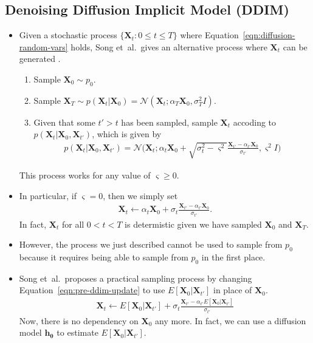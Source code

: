 \documentclass[10pt]{article}
\newcommand{\ve}[1]{\mathbf{#1}}
\newcommand{\ves}[1]{\boldsymbol{#1}}
\newcommand{\etal}{{et~al.}}
\newcommand{\mcal}[1]{\mathcal{#1}}
\begin{document}
\subsection{Denoising Diffusion Implicit Model (DDIM)}

\begin{itemize}  
  \item Given a stochastic process $\{ \ve{X}_t: 0 \leq t \leq T \}$ where Equation~\eqref{eqn:diffusion-random-vars} holds, Song \etal\ gives an alternative process where $\ve{X}_t$ can be generated \cite{Song:DDIM:2022}.
  \begin{enumerate}
    \item Sample $\ve{X}_0 \sim p_0$.
    \item Sample $\ve{X}_T \sim p(\ve{X}_t|\ve{X}_0) =  \mcal{N}(\ve{X}_t; \alpha_T \ve{X}_0, \sigma_T^2 I)$.
    \item Given that some $t' > t$ has been sampled, sample $\ve{X}_t$ accoding to $p(\ve{X}_t|\ve{X}_0, \ve{X}_{t'})$, which is given by
    \begin{align*}
      p(\ve{X}_t|\ve{X}_0, \ve{X}_{t'}) = \mcal{N}\bigg( \ve{X}_t; \alpha_t \ve{X}_0 + \sqrt{\sigma_t^2 - \varsigma^2} \frac{\ve{X}_{t'} - \alpha_{t'} \ve{X}_0}{\sigma_{t'}} , \varsigma^2 I \bigg)
    \end{align*}    
  \end{enumerate}
  This process works for any value of $\varsigma \geq 0$. 
  
  \item In particular, if $\varsigma = 0$, then we simply set
  \begin{align}
    \ve{X}_{t} \gets \alpha_t \ve{X}_0 + \sigma_t \frac{\ve{X}_{t'} - \alpha_{t'} \ve{X}_0}{\sigma_{t'}}. \label{eqn:pre-ddim-update}
  \end{align}
  In fact, $\ve{X}_t$ for all $0 < t < T$ is determistic given we have sampled $\ve{X}_0$ and $\ve{X}_T$.

  \item However, the process we just described cannot be used to sample from $p_0$ because it requires being able to sample from $p_0$ in the first place.
  
  \item Song \etal\ proposes a practical sampling process by changing Equation~\eqref{eqn:pre-ddim-update} to use $E[\ve{X}_0|\ve{X}_{t'}]$ in place of $\ve{X}_0$.
  \begin{align}
    \ve{X}_t \gets E[\ve{X}_0|\ve{X}_{t'}] + \sigma_t \frac{\ve{X}_{t'} - \alpha_{t'} E[\ve{X}_0|\ve{X}_{t'}]}{\sigma_{t'}} \label{eqn:ddim-update}
  \end{align}
  Now, there is no dependency on $\ve{X}_0$ any more. In fact, we can use a diffusion model $\ve{h}_{\ves{\theta}}$ to estimate $E[\ve{X}_0|\ve{X}_{t'}]$.
  

\end{itemize}
\end{document}
